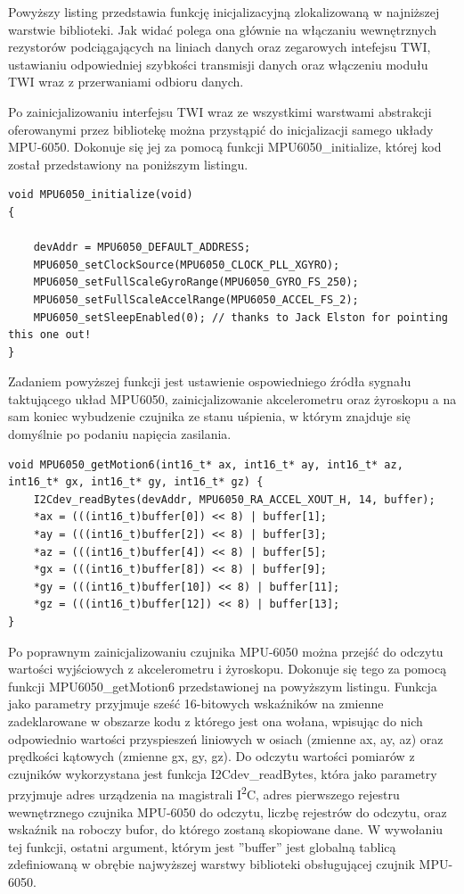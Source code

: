 Powyższy listing przedstawia funkcję inicjalizacyjną zlokalizowaną w najniższej warstwie biblioteki. Jak widać polega ona głównie na włączaniu wewnętrznych rezystorów podciągających na liniach danych oraz zegarowych intefejsu TWI, ustawianiu odpowiedniej szybkości transmisji danych oraz włączeniu modułu TWI wraz z przerwaniami odbioru danych.

Po zainicjalizowaniu interfejsu TWI wraz ze wszystkimi warstwami abstrakcji oferowanymi przez bibliotekę można przystąpić do inicjalizacji samego układy MPU-6050. Dokonuje się jej za pomocą funkcji MPU6050\_initialize, której kod został przedstawiony na poniższym listingu.

\begin{lstlisting}
void MPU6050_initialize(void) 
{
	
	devAddr = MPU6050_DEFAULT_ADDRESS;
    MPU6050_setClockSource(MPU6050_CLOCK_PLL_XGYRO);
    MPU6050_setFullScaleGyroRange(MPU6050_GYRO_FS_250);
    MPU6050_setFullScaleAccelRange(MPU6050_ACCEL_FS_2);
    MPU6050_setSleepEnabled(0); // thanks to Jack Elston for pointing this one out!
}
\end{lstlisting}

Zadaniem powyższej funkcji jest ustawienie ospowiedniego źródła sygnału taktującego układ MPU6050, zainicjalizowanie akcelerometru oraz żyroskopu a na sam koniec wybudzenie czujnika ze stanu uśpienia, w którym znajduje się domyślnie po podaniu napięcia zasilania.

\begin{lstlisting}
void MPU6050_getMotion6(int16_t* ax, int16_t* ay, int16_t* az, int16_t* gx, int16_t* gy, int16_t* gz) {
    I2Cdev_readBytes(devAddr, MPU6050_RA_ACCEL_XOUT_H, 14, buffer);
    *ax = (((int16_t)buffer[0]) << 8) | buffer[1];
    *ay = (((int16_t)buffer[2]) << 8) | buffer[3];
    *az = (((int16_t)buffer[4]) << 8) | buffer[5];
    *gx = (((int16_t)buffer[8]) << 8) | buffer[9];
    *gy = (((int16_t)buffer[10]) << 8) | buffer[11];
    *gz = (((int16_t)buffer[12]) << 8) | buffer[13];
}
\end{lstlisting}

Po poprawnym zainicjalizowaniu czujnika MPU-6050 można przejść do odczytu wartości wyjściowych z akcelerometru i żyroskopu. Dokonuje się tego za pomocą funkcji MPU6050\_getMotion6 przedstawionej na powyższym listingu. Funkcja jako parametry przyjmuje sześć 16-bitowych wskaźników na zmienne zadeklarowane w obszarze kodu z którego jest ona wołana, wpisując do nich odpowiednio wartości przyspieszeń liniowych w osiach (zmienne ax, ay, az) oraz prędkości kątowych (zmienne gx, gy, gz). Do odczytu wartości pomiarów z czujników wykorzystana jest funkcja I2Cdev\_readBytes, która jako parametry przyjmuje adres urządzenia na magistrali I\textsuperscript{2}C, adres pierwszego rejestru wewnętrznego czujnika MPU-6050 do odczytu, liczbę rejestrów do odczytu, oraz wskaźnik na roboczy bufor, do którego zostaną skopiowane dane. W wywołaniu tej funkcji, ostatni argument, którym jest ''buffer'' jest globalną tablicą zdefiniowaną w obrębie najwyższej warstwy biblioteki obsługującej czujnik MPU-6050.


